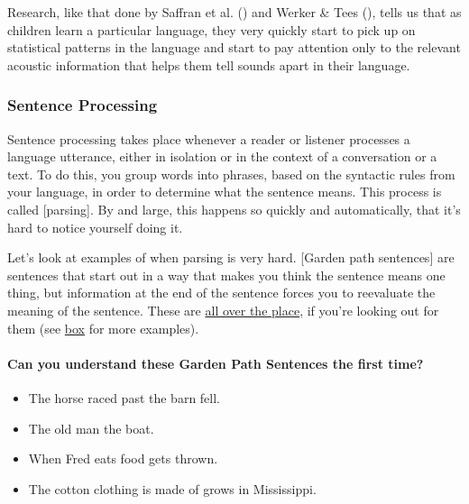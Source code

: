 \documentclass[
]{krantz}
\providecommand{\tightlist}{%
  \setlength{\itemsep}{0pt}\setlength{\parskip}{0pt}}
\begin{document}
Research, like that done by Saffran et al. () and Werker \& Tees (), tells us that as children learn a particular language, they very quickly start to pick up on statistical patterns in the language and start to pay attention only to the relevant acoustic information that helps them tell sounds apart in their language.

\subsubsection*{Sentence Processing}\label{sentence-processing}


Sentence processing takes place whenever a reader or listener processes a language utterance, either in isolation or in the context of a conversation or a text. To do this, you group words into phrases, based on the syntactic rules from your language, in order to determine what the sentence means. This process is called {[}parsing{]}. By and large, this happens so quickly and automatically, that it's hard to notice yourself doing it.

Let's look at examples of when parsing is very hard. {[}Garden path sentences{]} are sentences that start out in a way that makes you think the sentence means one thing, but information at the end of the sentence forces you to reevaluate the meaning of the sentence. These are \href{https://www.theguardian.com/world/2018/apr/10/spanish-politicians-urged-to-resign-over-fake-degree-claims}{all over the place}, if you're looking out for them (see \hyperref[can-you-understand-these-garden-path-sentences-the-first-time]{box} for more examples).

\paragraph*{Can you understand these Garden Path Sentences the first time?}\label{can-you-understand-these-garden-path-sentences-the-first-time}

\begin{itemize}
\tightlist
\item
  The horse raced past the barn fell.
\item
  The old man the boat.
\item
  When Fred eats food gets thrown.
\item
  The cotton clothing is made of grows in Mississippi.
\end{itemize}
\end{document}
